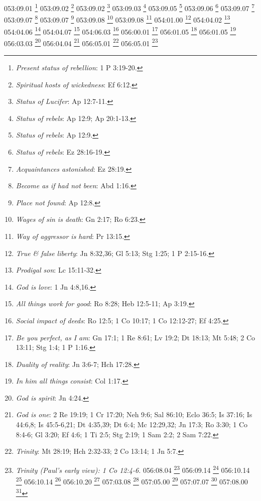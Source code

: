 {{{{{{{{{{{{{{{{{{{053:09.01 \footnote{\textit{Present status of rebellion}: 1 P 3:19-20.}
053:09.02 \footnote{\textit{Spiritual hosts of wickedness}: Ef 6:12.}
053:09.02 \footnote{\textit{Status of Lucifer}: Ap 12:7-11.}
053:09.03 \footnote{\textit{Status of rebels}: Ap 12:9; Ap 20:1-13.}
053:09.05 \footnote{\textit{Status of rebels}: Ap 12:9.}
053:09.06 \footnote{\textit{Status of rebels}: Ez 28:16-19.}
053:09.07 \footnote{\textit{Acquaintances astonished}: Ez 28:19.}
053:09.07 \footnote{\textit{Become as if had not been}: Abd 1:16.}
053:09.07 \footnote{\textit{Place not found}: Ap 12:8.}
053:09.08 \footnote{\textit{Wages of sin is death}: Gn 2:17; Ro 6:23.}
053:09.08 \footnote{\textit{Way of aggressor is hard}: Pr 13:15.}
054:01.00 \footnote{\textit{True & false liberty}: Jn 8:32,36; Gl 5:13; Stg 1:25; 1 P 2:15-16.}
054:04.02 \footnote{\textit{Prodigal son}: Lc 15:11-32.}
054:04.06 \footnote{\textit{God is love}: 1 Jn 4:8,16.}
054:04.07 \footnote{\textit{All things work for good}: Ro 8:28; Heb 12:5-11; Ap 3:19.}
054:06.03 \footnote{\textit{Social impact of deeds}: Ro 12:5; 1 Co 10:17; 1 Co 12:12-27; Ef 4:25.}
056:00.01 \footnote{\textit{Be you perfect, as I am}: Gn 17:1; 1 Re 8:61; Lv 19:2; Dt 18:13; Mt 5:48; 2 Co 13:11; Stg 1:4; 1 P 1:16.}
056:01.05 \footnote{\textit{Duality of reality}: Jn 3:6-7; Hch 17:28.}
056:01.05 \footnote{\textit{In him all things consist}: Col 1:17.}
056:03.03 \footnote{\textit{God is spirit}: Jn 4:24.}
056:04.04 \footnote{\textit{God is one}: 2 Re 19:19; 1 Cr 17:20; Neh 9:6; Sal 86:10; Eclo 36:5; Is 37:16; Is 44:6,8; Is 45:5-6,21; Dt 4:35,39; Dt 6:4; Mc 12:29,32; Jn 17:3; Ro 3:30; 1 Co 8:4-6; Gl 3:20; Ef 4:6; 1 Ti 2:5; Stg 2:19; 1 Sam 2:2; 2 Sam 7:22.}
056:05.01 \footnote{\textit{Trinity}: Mt 28:19; Hch 2:32-33; 2 Co 13:14; 1 Jn 5:7.}
056:05.01 \footnote{\textit{Trinity (Paul's early view): 1 Co 12:4-6.}
056:08.04 \footnote{\textit{Son imitates father}: Jn 5:19; Jn 8:38.}
056:09.14 \footnote{\textit{God is all and in all things}: Hch 17:28; Ro 11:36; 1 Co 8:6; 1 Co 12:6; 1 Co 15:28; Ef 1:23; Ef 4:6; Col 1:17; Col 3:11; Heb 2:10-11.}
056:10.14 \footnote{\textit{If be greatest, become server}: Mt 20:26-27; Mt 23:11-12; Mc 9:35; Mc 10:43-44; Lc 22:26.}
056:10.14 \footnote{\textit{No man lives by himself}: Ro 14:7.}
056:10.20 \footnote{\textit{God is love}: 1 Jn 4:8,16.}
057:03.08 \footnote{\textit{Michael's creation}: Sal 33:6; Sal 102:25; Is 45:12,18; Jn 1:1-3; Ef 2:10; Ef 3:9; Col 1:16; Heb 1:2,10; Ap 4:11.}
057:05.00 \footnote{\textit{Solar system}: Gn 1:3.}
057:07.07 \footnote{\textit{Water}: Gn 1:6-10; Gn 2:6.}
057:08.00 \footnote{\textit{Crustal stabilization}: Gn 1:9-10.}
}}}}}}}}}}}}}}}}}}}}
